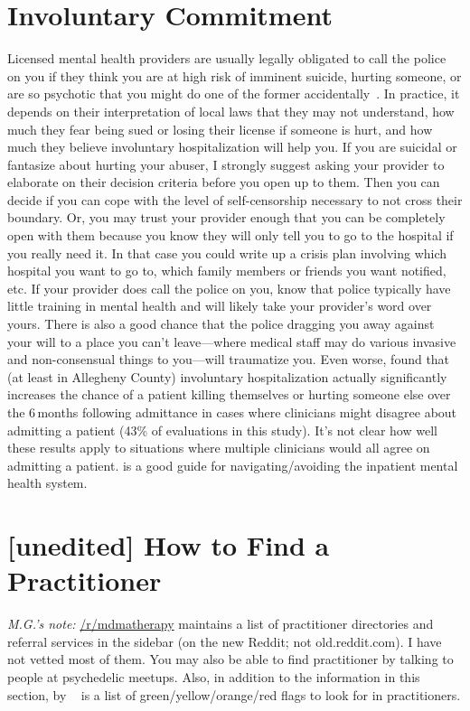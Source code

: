 \documentclass[11pt,oneside]{book}
\let\cite\parencite
\newcommand{\prosecite}[1]{\citetitle{#1} by \citefullauthor{#1}~\cite{#1}}
\begin{document}
\section{Involuntary Commitment}
\label{suicideCops}
Licensed mental health providers are usually legally obligated to call the police on you if they think you are at high risk of imminent suicide, hurting someone, or are so psychotic that you might do one of the former accidentally~\cite{alexanderInpatient}. In practice, it depends on their interpretation of local laws that they may not understand, how much they fear being sued or losing their license if someone is hurt, and how much they believe involuntary hospitalization will help you. If you are suicidal or fantasize about hurting your abuser, I strongly suggest asking your provider to elaborate on their decision criteria before you open up to them. Then you can decide if you can cope with the level of self-censorship necessary to not cross their boundary. Or, you may trust your provider enough that you can be completely open with them because you know they will only tell you to go to the hospital if you really need it. In that case you could write up a crisis plan involving which hospital you want to go to, which family members or friends you want notified, etc. If your provider does call the police on you, know that police typically have little training in mental health and will likely take your provider's word over yours. There is also a good chance that the police dragging you away against your will to a place you can't leave---where medical staff may do various invasive and non-consensual things to you---will traumatize you. Even worse, \textcite{emanuelHospitalization} found that (at least in Allegheny County) involuntary hospitalization actually significantly increases the chance of a patient killing themselves or hurting someone else over the 6\,months following admittance in cases where clinicians might disagree about admitting a patient (43\% of evaluations in this study). It's not clear how well these results apply to situations where multiple clinicians would all agree on admitting a patient. \textcite{alexanderInpatient} is a good guide for navigating/avoiding the inpatient mental health system.

\section{[unedited] How to Find a Practitioner}
\label{sec:howtofind}
\textit{M.G.'s note:} \href{www.reddit.com/r/mdmatherapy}{/r/mdmatherapy} maintains a list of practitioner directories and referral services in the sidebar (on the new Reddit; not old.reddit.com). I have not vetted most of them. You may also be able to find practitioner by talking to people at psychedelic meetups. Also, in addition to the information in this section, \prosecite{safetyFlags} is a list of green/yellow/orange/red flags to look for in practitioners.
\end{document}
